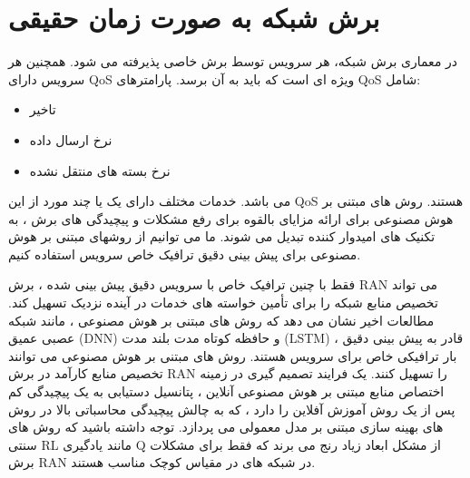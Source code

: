 \section{برش شبکه به صورت زمان حقیقی }
در معماری برش شبکه، هر سرویس توسط برش خاصی پذیرفته می شود. همچنین هر سرویس دارای QoS ویژه ای است که باید به آن برسد. پارامترهای QoS شامل:
\begin{itemize}
\item تاخیر
\item نرخ ارسال داده
\item نرخ بسته های منتقل نشده
\end{itemize}  
می باشد.
خدمات مختلف دارای یک یا چند مورد از این QoS هستند. روش های مبتنی بر هوش مصنوعی برای ارائه مزایای بالقوه برای رفع مشکلات و پیچیدگی های برش ، به تکنیک های امیدوار کننده تبدیل می شوند. ما می توانیم از روشهای مبتنی بر هوش مصنوعی برای پیش بینی دقیق ترافیک خاص سرویس استفاده کنیم.


فقط با چنین ترافیک خاص با سرویس دقیق پیش بینی شده ، برش RAN می تواند تخصیص منابع شبکه را برای تأمین خواسته های خدمات در آینده نزدیک تسهیل کند.
مطالعات اخیر نشان می دهد که روش های مبتنی بر هوش مصنوعی ، مانند شبکه عصبی عمیق (DNN) و حافظه کوتاه مدت بلند مدت (LSTM) ، قادر به پیش بینی دقیق بار ترافیکی خاص برای سرویس هستند.
روش های مبتنی بر هوش مصنوعی می توانند تخصیص منابع کارآمد در برش RAN را تسهیل کنند. یک فرایند تصمیم گیری در زمینه اختصاص منابع مبتنی بر هوش مصنوعی آنلاین ، پتانسیل دستیابی به یک پیچیدگی کم پس از یک روش آموزش آفلاین را دارد ، که به چالش پیچیدگی محاسباتی بالا در روش های بهینه سازی مبتنی بر مدل معمولی می پردازد.
  توجه داشته باشید که روش های سنتی RL مانند یادگیری Q از مشکل ابعاد زیاد رنج می برند که فقط برای مشکلات برش RAN در شبکه های در مقیاس کوچک مناسب هستند.

